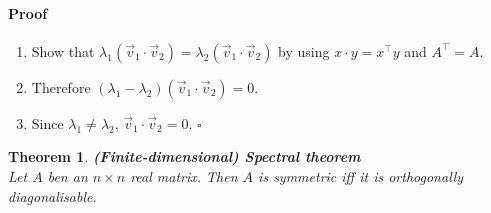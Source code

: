 \documentclass{article}
\theoremstyle{sltheorem}
\newtheorem{theorem}{Theorem}[section]
\begin{document}
\paragraph*{Proof}
\begin{enumerate}
    \item Show that $\lambda_1(\vec v_1 \cdot \vec v_2)=\lambda_2(\vec v_1\cdot\vec v_2)$ by using $x\cdot y =x^\intercal y$ and $A^\intercal =A$.
    \item Therefore $(\lambda_1-\lambda_2)(\vec v_1 \cdot \vec v_2)=0$.
    \item Since $\lambda_1\not=\lambda_2$, $\vec v_1 \cdot \vec v_2=0$. $\square$
\end{enumerate}
\begin{theorem}
    \textbf{(Finite-dimensional) Spectral theorem}\\
    Let $A$ ben an $n\times n$ real matrix. Then $A$ is symmetric iff it is orthogonally diagonalisable.
\end{theorem}
\end{document}
